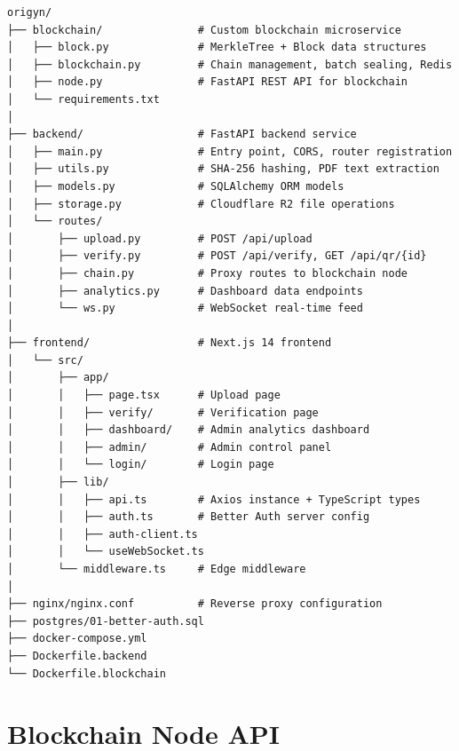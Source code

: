 \documentclass[12pt, a4paper]{report}
\begin{document}
\begin{verbatim}
origyn/
├── blockchain/               # Custom blockchain microservice
│   ├── block.py              # MerkleTree + Block data structures
│   ├── blockchain.py         # Chain management, batch sealing, Redis
│   ├── node.py               # FastAPI REST API for blockchain
│   └── requirements.txt
│
├── backend/                  # FastAPI backend service
│   ├── main.py               # Entry point, CORS, router registration
│   ├── utils.py              # SHA-256 hashing, PDF text extraction
│   ├── models.py             # SQLAlchemy ORM models
│   ├── storage.py            # Cloudflare R2 file operations
│   └── routes/
│       ├── upload.py         # POST /api/upload
│       ├── verify.py         # POST /api/verify, GET /api/qr/{id}
│       ├── chain.py          # Proxy routes to blockchain node
│       ├── analytics.py      # Dashboard data endpoints
│       └── ws.py             # WebSocket real-time feed
│
├── frontend/                 # Next.js 14 frontend
│   └── src/
│       ├── app/
│       │   ├── page.tsx      # Upload page
│       │   ├── verify/       # Verification page
│       │   ├── dashboard/    # Admin analytics dashboard
│       │   ├── admin/        # Admin control panel
│       │   └── login/        # Login page
│       ├── lib/
│       │   ├── api.ts        # Axios instance + TypeScript types
│       │   ├── auth.ts       # Better Auth server config
│       │   ├── auth-client.ts
│       │   └── useWebSocket.ts
│       └── middleware.ts     # Edge middleware
│
├── nginx/nginx.conf          # Reverse proxy configuration
├── postgres/01-better-auth.sql
├── docker-compose.yml
├── Dockerfile.backend
└── Dockerfile.blockchain
\end{verbatim}

\section{Blockchain Node API}
\end{document}
